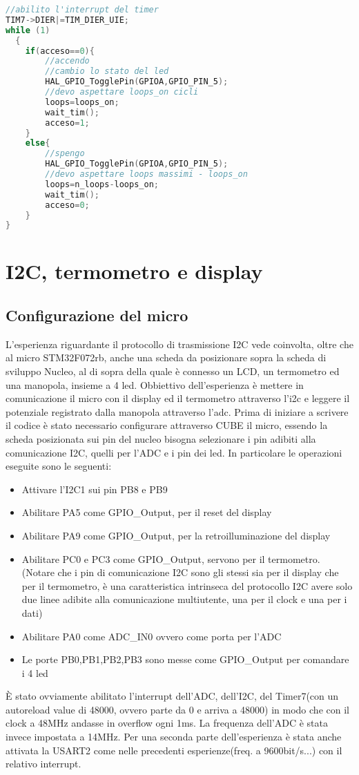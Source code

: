 \documentclass[main.tex]{subfiles}
\begin{document}
\begin{lstlisting}[language=C,caption=Main]
//abilito l'interrupt del timer
TIM7->DIER|=TIM_DIER_UIE;
while (1)
  {
	if(acceso==0){
		//accendo
		//cambio lo stato del led
		HAL_GPIO_TogglePin(GPIOA,GPIO_PIN_5);
		//devo aspettare loops_on cicli
		loops=loops_on;
		wait_tim();
		acceso=1;
	}
	else{
		//spengo
		HAL_GPIO_TogglePin(GPIOA,GPIO_PIN_5);
		//devo aspettare loops massimi - loops_on
		loops=n_loops-loops_on;
		wait_tim();
		acceso=0;
	}
}
\end{lstlisting}


\section{I2C, termometro e display}


\subsection{Configurazione del micro}


L'esperienza riguardante il protocollo di trasmissione I2C vede coinvolta, oltre che al micro STM32F072rb, anche una scheda da posizionare sopra la scheda di sviluppo Nucleo, al di sopra della quale è connesso un LCD, un termometro ed una manopola, insieme a 4 led. Obbiettivo dell'esperienza è mettere in comunicazione il micro con il display ed il termometro attraverso l'i2c e leggere il potenziale registrato dalla manopola attraverso l'adc. 
Prima di iniziare a scrivere il codice è stato necessario configurare attraverso CUBE il micro, essendo la scheda posizionata sui pin del nucleo bisogna selezionare i pin adibiti alla comunicazione I2C, quelli per l'ADC e i pin dei led. In particolare le operazioni eseguite sono le seguenti:
\begin{itemize}
    \item Attivare l'I2C1 sui pin PB8 e PB9
    \item Abilitare PA5 come GPIO\_Output, per il reset del display
    \item Abilitare PA9 come GPIO\_Output, per la retroilluminazione del display
    \item Abilitare PC0 e PC3 come GPIO\_Output, servono per il termometro. (Notare che i pin di comunicazione I2C sono gli stessi sia per il display che per il termometro, è una caratteristica intrinseca del protocollo I2C avere solo due linee adibite alla comunicazione multiutente, una per il clock e una per i dati)
    \item Abilitare PA0 come ADC\_IN0 ovvero come porta per l'ADC
    \item Le porte PB0,PB1,PB2,PB3 sono messe come GPIO\_Output per comandare i 4 led
\end{itemize}
È stato ovviamente abilitato l'interrupt dell'ADC, dell'I2C, del Timer7(con un autoreload value di 48000, ovvero parte da 0 e arriva a 48000) in modo che con il clock a 48MHz andasse in overflow ogni 1ms. La frequenza dell'ADC è stata invece impostata a 14MHz.
Per una seconda parte dell'esperienza è stata anche attivata la USART2 come nelle precedenti esperienze(freq. a 9600bit/s...) con il relativo interrupt.
\end{document}
